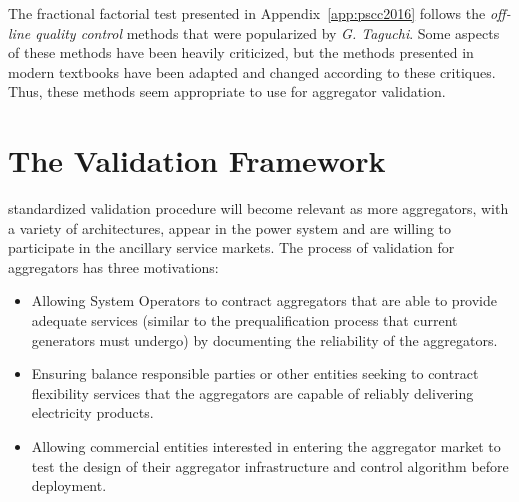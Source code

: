 The fractional factorial test presented in Appendix~\ref{app:pscc2016} follows the \emph{off-line quality control} methods that were popularized by \emph{G. Taguchi}. Some aspects of these methods have been heavily criticized, but the methods presented in modern textbooks have been adapted and changed according to these critiques. Thus, these methods seem appropriate to use for aggregator validation.

\section{The Validation Framework}

 standardized validation procedure will become relevant as more aggregators, with a variety of architectures, appear in the power system and are willing to participate in the ancillary service markets. The process of validation for aggregators has three motivations: 
\begin{itemize}
	\item Allowing System Operators to contract aggregators that are able to provide adequate services (similar to the prequalification process that current generators must undergo) by documenting the reliability of the aggregators.
	\item Ensuring balance responsible parties or other entities seeking to contract flexibility services that the aggregators are capable of reliably delivering electricity products.
	\item Allowing commercial entities interested in entering the aggregator market to test the design of their aggregator infrastructure and control algorithm before deployment.
\end{itemize}


